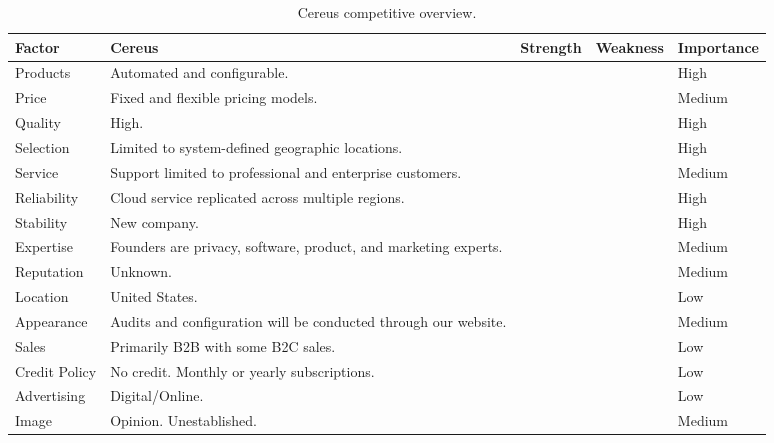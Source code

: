 \begin{table}[H]
  \centering
  \setlength\tabcolsep{5pt}
  \def\arraystretch{1.2}%

  \begin{tabularx}{\textwidth}{p{2cm}|p{6.2cm} p{1.5cm} p{1.75cm} p{1.85cm} }

    \hline

    Factor & Cereus & Strength & Weakness & Importance  \\
  
    \hline
  
    Products & Automated and configurable. & \centering{x} & & High \\

    Price & Fixed and flexible pricing models. & \centering{x} & & Medium \\

    Quality & High. & \centering{x} & & High \\

    Selection & Limited to system-defined geographic locations. & & \centering{x} & High \\

    Service & Support limited to professional and enterprise customers. & & \centering{x} & Medium \\

    Reliability & Cloud service replicated across multiple regions. & \centering{x} & & High \\

    Stability & New company. & & \centering{x} & High \\

    Expertise & Founders are privacy, software, product, and marketing experts. & \centering{x} & & Medium \\

    Reputation & Unknown. & & \centering{x} & Medium \\

    Location & United States. & & & Low \\

    Appearance & Audits and configuration will be conducted through our website. & & & Medium \\

    Sales & Primarily B2B with some B2C sales. & & & Low \\

    Credit Policy & No credit. Monthly or yearly subscriptions. & & & Low \\

    Advertising & Digital/Online. & & & Low \\

    Image & Opinion. Unestablished. & & \centering{x} & Medium \\

    \hline

  \end{tabularx}
  \caption{Cereus competitive overview.}
  \label{table.cereus.overview}
\end{table}


